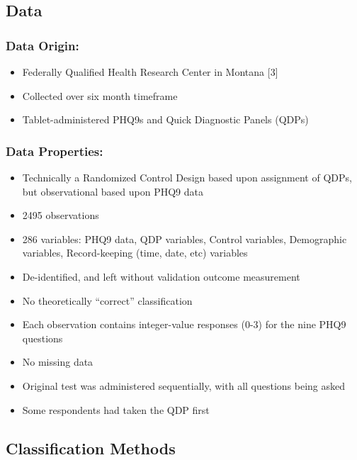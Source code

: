 \documentclass[12pt,]{article}
\providecommand{\tightlist}{%
  \setlength{\itemsep}{0pt}\setlength{\parskip}{0pt}}
\begin{document}
\hypertarget{data}{%
\subsection{Data}\label{data}}

\hypertarget{data-origin}{%
\subsubsection{Data Origin:}\label{data-origin}}

\begin{itemize}
\tightlist
\item
  Federally Qualified Health Research Center in Montana {[}3{]}
\item
  Collected over six month timeframe
\item
  Tablet-administered PHQ9s and Quick Diagnostic Panels (QDPs)
\end{itemize}

\hypertarget{data-properties}{%
\subsubsection{Data Properties:}\label{data-properties}}

\begin{itemize}
\tightlist
\item
  Technically a Randomized Control Design based upon assignment of QDPs,
  but observational based upon PHQ9 data
\item
  2495 observations
\item
  286 variables: PHQ9 data, QDP variables, Control variables,
  Demographic variables, Record-keeping (time, date, etc) variables
\item
  De-identified, and left without validation outcome measurement
\item
  No theoretically ``correct'' classification
\item
  Each observation contains integer-value responses (0-3) for the nine
  PHQ9 questions
\item
  No missing data
\item
  Original test was administered sequentially, with all questions being
  asked
\item
  Some respondents had taken the QDP first
\end{itemize}

\hypertarget{classification-methods}{%
\subsection{Classification Methods}\label{classification-methods}}
\end{document}
